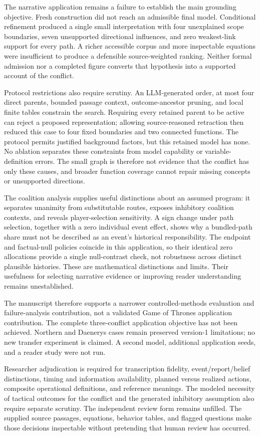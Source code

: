 The narrative application remains a failure to establish the main grounding objective. Fresh construction did not reach an admissible final model. Conditional refinement produced a single small interpretation with four unexplained scope boundaries, seven unsupported directional influences, and zero weakest-link support for every path. A richer accessible corpus and more inspectable equations were insufficient to produce a defensible source-weighted ranking. Neither formal admission nor a completed figure converts that hypothesis into a supported account of the conflict.

Protocol restrictions also require scrutiny. An LLM-generated order, at most four direct parents, bounded passage context, outcome-ancestor pruning, and local finite tables constrain the search. Requiring every retained parent to be active can reject a proposed representation; allowing source-reasoned retraction then reduced this case to four fixed boundaries and two connected functions. The protocol permits justified background factors, but this retained model has none. No ablation separates these constraints from model capability or variable-definition errors. The small graph is therefore not evidence that the conflict has only these causes, and broader function coverage cannot repair missing concepts or unsupported directions.

The coalition analysis supplies useful distinctions about an assumed program: it separates unanimity from substitutable routes, exposes inhibitory coalition contexts, and reveals player-selection sensitivity. A sign change under path selection, together with a zero individual event effect, shows why a bundled-path share must not be described as an event's historical responsibility. The endpoint and factual-null policies coincide in this application, so their identical zero allocations provide a single null-contrast check, not robustness across distinct plausible histories. These are mathematical distinctions and limits. Their usefulness for selecting narrative evidence or improving reader understanding remains unestablished.

The manuscript therefore supports a narrower controlled-methods evaluation and failure-analysis contribution, not a validated Game of Thrones application contribution. The complete three-conflict application objective has not been achieved. Northern and Daenerys cases remain preserved version-1 limitations; no new transfer experiment is claimed. A second model, additional application seeds, and a reader study were not run.

Researcher adjudication is required for transcription fidelity, event/report/belief distinctions, timing and information availability, planned versus realized actions, composite operational definitions, and reference meanings. The modeled necessity of tactical outcomes for the conflict and the generated inhibitory assumption also require separate scrutiny. The independent review form remains unfilled. The supplied source passages, equations, behavior tables, and flagged questions make those decisions inspectable without pretending that human review has occurred.
